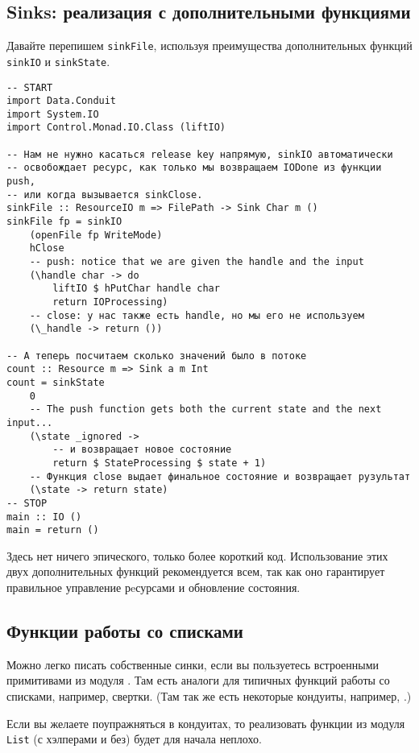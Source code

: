 \subsection{Sinks: реализация с дополнительными функциями}
Давайте перепишем \lstinline'sinkFile', используя преимущества дополнительных функций 
\lstinline'sinkIO' и \lstinline'sinkState'.
\begin{lstlisting}
-- START
import Data.Conduit
import System.IO
import Control.Monad.IO.Class (liftIO)

-- Нам не нужно касаться release key напрямую, sinkIO автоматически
-- освобождает ресурс, как только мы возвращаем IODone из функции push,
-- или когда вызывается sinkClose.
sinkFile :: ResourceIO m => FilePath -> Sink Char m ()
sinkFile fp = sinkIO
    (openFile fp WriteMode)
    hClose
    -- push: notice that we are given the handle and the input
    (\handle char -> do
        liftIO $ hPutChar handle char
        return IOProcessing)
    -- close: у нас также есть handle, но мы его не используем
    (\_handle -> return ())

-- А теперь посчитаем сколько значений было в потоке
count :: Resource m => Sink a m Int
count = sinkState
    0
    -- The push function gets both the current state and the next input...
    (\state _ignored ->
        -- и возвращает новое состояние
        return $ StateProcessing $ state + 1)
    -- Функция close выдает финальное состояние и возвращает рузультат
    (\state -> return state)
-- STOP
main :: IO ()
main = return ()
\end{lstlisting}
Здесь нет ничего эпического, только более короткий код. Использование этих двух
дополнительных  функций рекомендуется всем, так как оно гарантирует правильное
управление рeсурсами и обновление состояния.

\subsection{Функции работы со списками}
Можно легко писать собственные синки, если вы пользуетесь встроенными примитивами из
модуля 
. Там есть аналоги для типичных функций работы со
списками, например, свертки. (Там так же есть некоторые кондуиты,
например, 
.)

Если вы желаете поупражняться в кондуитах, то реализовать функции из модуля 
\lstinline'List' (с хэлперами и без) будет для начала неплохо.

